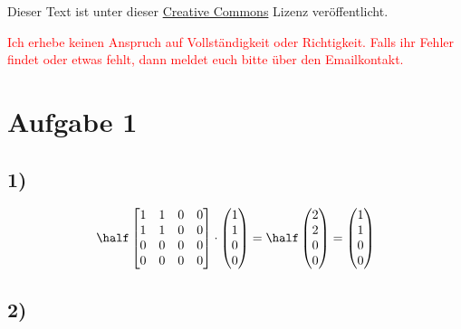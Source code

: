 




\maketitle

Dieser Text ist unter dieser \href{http://creativecommons.org/licenses/by-nc-sa/4.0/}{Creative Commons} Lizenz veröffentlicht.

\textcolor{red}{Ich erhebe keinen Anspruch auf Vollständigkeit oder Richtigkeit. Falls ihr Fehler findet oder etwas fehlt, dann meldet euch bitte über den Emailkontakt.}

\tableofcontents


\newpage



\section{Aufgabe 1}

\subsection*{1)}

\begin{align*}
\half 
\left[
\begin{matrix}
1 & 1 & 0 & 0 \\ 
1 & 1 & 0 & 0 \\ 
0 & 0 & 0 & 0 \\ 
0 & 0 & 0 & 0
\end{matrix} 
\right]
\cdot
\left(
\begin{matrix}
1 \\ 
1 \\ 
0 \\ 
0
\end{matrix} 
\right)
=
\half
\left(
\begin{matrix}
2 \\ 
2 \\ 
0 \\ 
0
\end{matrix} 
\right)
=
\left(
\begin{matrix}
1 \\ 
1 \\ 
0 \\ 
0
\end{matrix} 
\right)
\end{align*}


\subsection*{2)}


